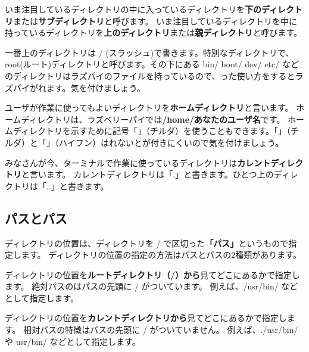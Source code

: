 
いま注目しているディレクトリの中に入っているディレクトリを{\bf 下のディレクトリ}または{\bf サブディレクトリ}と呼びます。
いま注目しているディレクトリを中に持っているディレクトリを{\bf 上のディレクトリ}または{\bf 親ディレクトリ}と呼びます。


一番上のディレクトリは / (スラッシュ)で書きます。特別なディレクトリで、root(ルート)ディレクトリと呼びます。その下にある bin/ boot/ dev/ etc/ などのディレクトリはラズパイのファイルを持っているので、った使い方をするとラズパイがれます。気を付けましょう。


ユーザが作業に使ってもよいディレクトリを{\bf ホームディレクトリ}と言います。
ホームディレクトリは、ラズベリーパイでは{\bf /home/あなたのユーザ名}です。
ホームディレクトリを示すために記号「\code{\textasciitilde}」（チルダ）を使うこともできます。「\code{\textasciitilde}」（チルダ）と「\code{-}」（ハイフン）はれないとが付きにくいので気を付けましょう。


みなさんが今、ターミナルで作業に使っているディレクトリは{\bf カレントディレクトリ}と言います。
カレントディレクトリは「.」と書きます。ひとつ上のディレクトリは「..」と書きます。

\subsection{パスとパス}
ディレクトリの位置は、ディレクトリを / で区切った{\bf 「パス」}というもので指定します。
ディレクトリの位置の指定の方法はパスとパスの2種類があります。


ディレクトリの位置を{\bf ルートディレクトリ（/）から}見てどこにあるかで指定します。
絶対パスのはパスの先頭に / がついています。
例えば、/usr/bin/ などとして指定します。


ディレクトリの位置を{\bf カレントディレクトリから}見てどこにあるかで指定します。
相対パスの特徴はパスの先頭に / がついていません。
例えば、./usr/bin/ や usr/bin/ などとして指定します。

